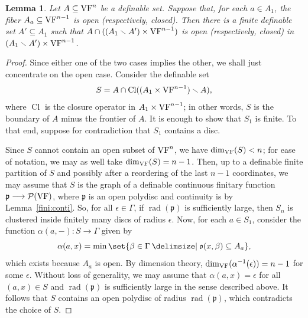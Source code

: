 \documentclass[12pt]{amsart}
\theoremstyle{plain}
\newtheorem{lem}[thm]{Lemma}
\theoremstyle{definition}
\theoremstyle{remark}
\numberwithin{equation}{section}
\theoremstyle{plain}
\newcommand{\VF}{\textup{VF}}
\newcommand{\go}{\mathfrak{o}}
\newcommand{\gp}{\mathfrak{p}}
\newcommand{\0}{\emptyset}
\newcommand{\mdl}[1]{\mathcal{#1}}  %
\newcommand{\fun}{\longrightarrow}
\newcommand{\sub}{\subseteq}
\newcommand{\mi}{\smallsetminus}
\providecommand\given{}
\newcommand\SetSymbol[1][]{%
\nonscript \: #1 \vert
\allowbreak
\nonscript\:
\mathopen{}}
\renewcommand\given{\SetSymbol[\delimsize]}
\DeclareMathOperator{\rad}{rad}
\DeclareMathOperator{\Cl}{Cl}
\begin{document}
\begin{lem}\label{lem:open:fiberwise}
Let $A\subseteq \VF^n$ be a definable set. Suppose that, for each $a \in A_1$, the fiber $A_a \sub \VF^{n-1}$ is open (respectively, closed). Then there is a finite definable set $A' \subseteq A_1$ such that $A\cap ((A_1 \mi A')\times \VF^{n-1})$ is open (respectively, closed) in $(A_1 \mi A')\times \VF^{n-1}$.
\end{lem}
\begin{proof}
Since either one of the two cases implies the other, we shall just concentrate on the open case. Consider the  definable set
\[
S=A\cap \Cl((A_1\times \VF^{n-1}) \mi A),
\]
where $\Cl$ is the closure operator in $A_1\times \VF^{n-1}$; in other words, $S$ is the boundary of $A$ minus the frontier of $A$. It is enough to show that $S_1$ is finite. To that end, suppose for contradiction that $S_1$  contains a disc.

Since $S$ cannot contain an open subset of $\VF^n$, we have $\dim_{\VF}(S)<n$; for ease of notation, we may as well take $\dim_{\VF}(S) = n-1$. Then, up to a definable finite partition of $S$ and possibly after a reordering of the last $n-1$ coordinates, we may assume that $S$ is the graph of a definable continuous finitary function $\gp \fun \mdl P(\VF)$, where $\gp$ is an open polydisc and continuity is by Lemma~\ref{fini:conti}. So, for all $\epsilon \in \Gamma$, if $\rad(\gp)$ is sufficiently large, then $S_n$ is clustered inside finitely many discs of radius $\epsilon$. Now, for each $a \in S_1$, consider the function $\alpha(a, -): S \fun \Gamma$ given by
\[
\alpha(a,x) = \min \set{\beta\in \Gamma \given  \go(x, \beta)\subseteq A_a},
\]
which exists because $A_a$ is open. By dimension theory, $\dim_{\VF}(\alpha^{-1}(\epsilon)) = n-1$ for some $\epsilon$. Without loss of generality, we may assume that $\alpha(a,x) = \epsilon$ for all $(a,x)\in S$ and $\rad(\gp)$ is sufficiently large in the sense described above. It follows that $S$ contains an open polydisc of radius $\rad(\gp)$, which contradicts the choice of $S$.
\end{proof}
\end{document}
